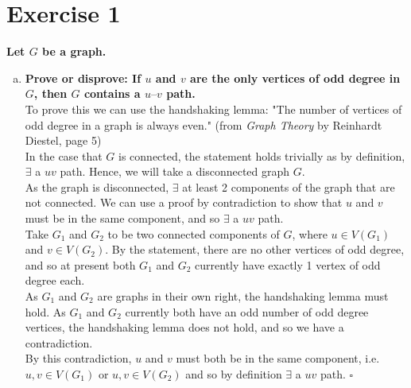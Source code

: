 \section*{Exercise 1}
\boldmath
\textbf{Let $G$ be a graph.}
\begin{enumerate}[a)]
    \item \textbf{Prove or disprove: If $u$ and $v$ are the only vertices of odd degree in $G$, then $G$ contains a $u–v$ path.} 
    \unboldmath
    \\
    \linebreak 
    To prove this we can use the handshaking lemma: "The number of vertices of odd degree in a graph is always even." (from \textit{Graph Theory} by Reinhardt Diestel, page 5)\\
    \linebreak 
    In the case that $G$ is connected, the statement holds trivially as by definition, $\exists$ a $uv$ path. Hence, we will take a disconnected graph $G$. \\
    \linebreak 
    As the graph is disconnected, $\exists $ at least 2 components of the graph that are not connected. We can use a proof by contradiction to show that $u$ and $v$ must be in the same component, and so $\exists$ a $uv$ path. \\
    \linebreak
    Take $G_1$ and $G_2$ to be two connected components of $G$, where $u \in V(G_1)$ and $v \in V(G_2)$. By the statement, there are no other vertices of odd degree, and so at present both $G_1$ and $G_2$ currently have exactly 1 vertex of odd degree each. \\
    \linebreak 
    As $G_1$ and $G_2$ are graphs in their own right, the handshaking lemma must hold. As $G_1$ and $G_2$ currently both have an odd number of odd degree vertices, the handshaking lemma does not hold, and so we have a contradiction. \\
    \linebreak 
    By this contradiction, $u$ and $v$ must both be in the same component, i.e. $u, v \in V(G_1)$ or $u, v \in V(G_2)$ and so by definition $\exists$ a $uv$ path. \hspace{10mm} $\square$ \\
    \linebreak 

\end{enumerate}
